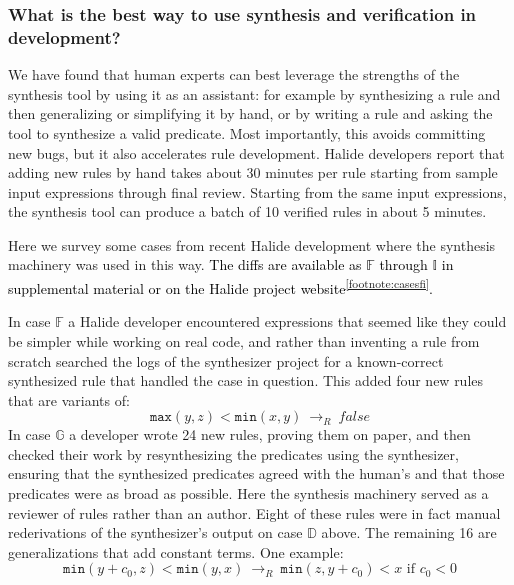 \documentclass[acmsmall]{acmart}\settopmatter{}
\newcommand{\modified}[1]{\textcolor{black}{{#1}}}
\newcommand{\hmax}[0]{\texttt{max}}
\newcommand{\hmin}[0]{\texttt{min}}
\newcommand{\rewrites}[0]{\:\rightarrow_{R}\:}
\newcommand{\pred}[0]{\textrm{ if }}
\begin{document}
\subsubsection{What is the best way to use synthesis and verification in development?}
\label{sub:synthassistant}


We have found that human experts can best leverage the strengths of the synthesis tool by using it as an assistant: for example by synthesizing a rule and then generalizing or simplifying it by hand, or by writing a rule and asking the tool to synthesize a valid predicate. Most importantly, this avoids committing new bugs, but it also accelerates rule development. Halide developers report that adding new rules by hand takes about 30 minutes per rule starting from sample input expressions through final review. Starting from the same input expressions, the synthesis tool can produce a batch of 10 verified rules in about 5 minutes.

Here we survey some cases from recent Halide development where the synthesis machinery was used in this way. \modified{The diffs are available as $\mathbb{F}$ through $\mathbb{I}$ in supplemental material or on the Halide project website\textsuperscript{\ref{footnote:casesfi}}.}

In case $\mathbb{F}$ a Halide developer encountered expressions that seemed like they could be simpler while working on real code, and rather than inventing a rule from scratch searched the logs of the synthesizer project for a known-correct synthesized rule that handled the case in question. This added four new rules that are variants of:
\[
\hmax(y, z) < \hmin(x, y) \rewrites \mathit{false}
\]
In case $\mathbb{G}$ a developer wrote 24 new rules, proving them on paper, and then checked their work by resynthesizing the predicates using the synthesizer, ensuring that the synthesized predicates agreed with the human’s and that those predicates were as broad as possible. Here the synthesis machinery served as a reviewer of rules rather than an author. Eight of these rules were in fact manual rederivations of the synthesizer’s output on case $\mathbb{D}$ above. The remaining 16 are generalizations that add constant terms. One example:
\[
\hmin(y + c_0, z) < \hmin(y, x) \rewrites \hmin(z, y + c_0) < x \pred c_0 < 0
\]
\end{document}

